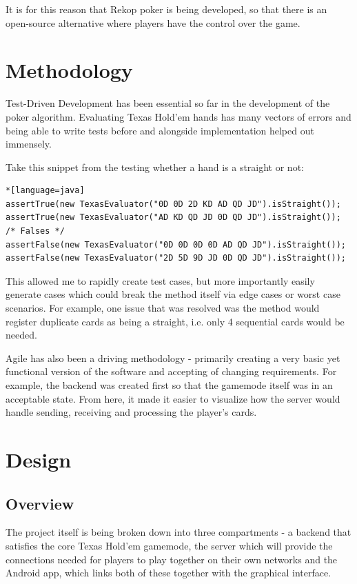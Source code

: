 \documentclass[11pt]{article}
\begin{document}
It is for this reason that Rekop poker is being developed, so that there is an open-source alternative where players have the control over the game. 


\section{Methodology}

Test-Driven Development has been essential so far in the development of the poker algorithm. Evaluating Texas Hold'em hands has many vectors of errors and being able to write tests before and alongside implementation helped out immensely. 

Take this snippet from the testing whether a hand is a straight or not: 

\begin{lstlisting}*[language=java]
assertTrue(new TexasEvaluator("0D 0D 2D KD AD QD JD").isStraight());
assertTrue(new TexasEvaluator("AD KD QD JD 0D QD JD").isStraight());
/* Falses */
assertFalse(new TexasEvaluator("0D 0D 0D 0D AD QD JD").isStraight());
assertFalse(new TexasEvaluator("2D 5D 9D JD 0D QD JD").isStraight());

\end{lstlisting}

This allowed me to rapidly create test cases, but more importantly easily generate cases which could break the method itself via edge cases or worst case scenarios. For example, one issue that was resolved was the method would register duplicate cards as being a straight, i.e. only 4 sequential cards would be needed. 

Agile has also been a driving methodology - primarily creating a very basic yet functional version of the software and accepting of changing requirements. For example, the backend was created first so that the gamemode itself was in an acceptable state. From here, it made it easier to visualize how the server would handle sending, receiving and processing the player's cards. 


\newpage
\section{Design}

\subsection{Overview}

The project itself is being broken down into three compartments - a backend that satisfies the core Texas Hold'em gamemode, the server which will provide the connections needed for players to play together on their own networks and the Android app, which links both of these together with the graphical interface. 
\end{document}
